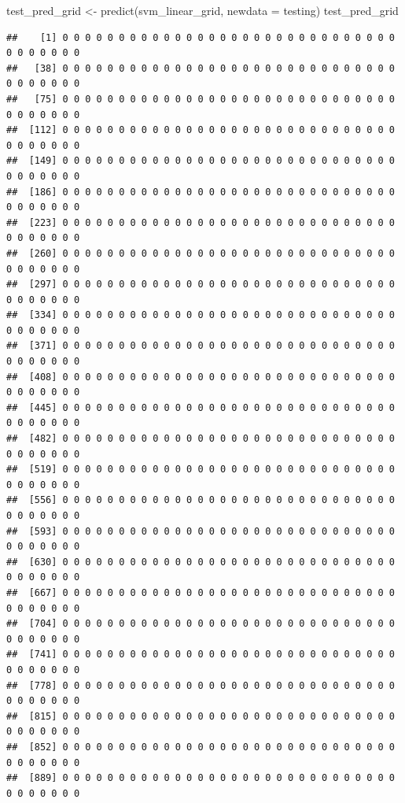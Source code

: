 \documentclass[
]{article}
\newenvironment{Shaded}{\begin{snugshade}}{\end{snugshade}}
\newcommand{\AttributeTok}[1]{\textcolor[rgb]{0.77,0.63,0.00}{#1}}
\newcommand{\FunctionTok}[1]{\textcolor[rgb]{0.00,0.00,0.00}{#1}}
\newcommand{\NormalTok}[1]{#1}
\newcommand{\OtherTok}[1]{\textcolor[rgb]{0.56,0.35,0.01}{#1}}
\renewcommand{\=}[1]{\stackrel{#1}{=}}
\theoremstyle{definition}
\theoremstyle{remark}
\begin{document}
\begin{Shaded}
\begin{Highlighting}[]
\NormalTok{test\_pred\_grid }\OtherTok{\textless{}{-}} \FunctionTok{predict}\NormalTok{(svm\_linear\_grid, }\AttributeTok{newdata =}\NormalTok{ testing)}
\NormalTok{test\_pred\_grid }
\end{Highlighting}
\end{Shaded}

\begin{verbatim}
##    [1] 0 0 0 0 0 0 0 0 0 0 0 0 0 0 0 0 0 0 0 0 0 0 0 0 0 0 0 0 0 0 0 0 0 0 0 0 0
##   [38] 0 0 0 0 0 0 0 0 0 0 0 0 0 0 0 0 0 0 0 0 0 0 0 0 0 0 0 0 0 0 0 0 0 0 0 0 0
##   [75] 0 0 0 0 0 0 0 0 0 0 0 0 0 0 0 0 0 0 0 0 0 0 0 0 0 0 0 0 0 0 0 0 0 0 0 0 0
##  [112] 0 0 0 0 0 0 0 0 0 0 0 0 0 0 0 0 0 0 0 0 0 0 0 0 0 0 0 0 0 0 0 0 0 0 0 0 0
##  [149] 0 0 0 0 0 0 0 0 0 0 0 0 0 0 0 0 0 0 0 0 0 0 0 0 0 0 0 0 0 0 0 0 0 0 0 0 0
##  [186] 0 0 0 0 0 0 0 0 0 0 0 0 0 0 0 0 0 0 0 0 0 0 0 0 0 0 0 0 0 0 0 0 0 0 0 0 0
##  [223] 0 0 0 0 0 0 0 0 0 0 0 0 0 0 0 0 0 0 0 0 0 0 0 0 0 0 0 0 0 0 0 0 0 0 0 0 0
##  [260] 0 0 0 0 0 0 0 0 0 0 0 0 0 0 0 0 0 0 0 0 0 0 0 0 0 0 0 0 0 0 0 0 0 0 0 0 0
##  [297] 0 0 0 0 0 0 0 0 0 0 0 0 0 0 0 0 0 0 0 0 0 0 0 0 0 0 0 0 0 0 0 0 0 0 0 0 0
##  [334] 0 0 0 0 0 0 0 0 0 0 0 0 0 0 0 0 0 0 0 0 0 0 0 0 0 0 0 0 0 0 0 0 0 0 0 0 0
##  [371] 0 0 0 0 0 0 0 0 0 0 0 0 0 0 0 0 0 0 0 0 0 0 0 0 0 0 0 0 0 0 0 0 0 0 0 0 0
##  [408] 0 0 0 0 0 0 0 0 0 0 0 0 0 0 0 0 0 0 0 0 0 0 0 0 0 0 0 0 0 0 0 0 0 0 0 0 0
##  [445] 0 0 0 0 0 0 0 0 0 0 0 0 0 0 0 0 0 0 0 0 0 0 0 0 0 0 0 0 0 0 0 0 0 0 0 0 0
##  [482] 0 0 0 0 0 0 0 0 0 0 0 0 0 0 0 0 0 0 0 0 0 0 0 0 0 0 0 0 0 0 0 0 0 0 0 0 0
##  [519] 0 0 0 0 0 0 0 0 0 0 0 0 0 0 0 0 0 0 0 0 0 0 0 0 0 0 0 0 0 0 0 0 0 0 0 0 0
##  [556] 0 0 0 0 0 0 0 0 0 0 0 0 0 0 0 0 0 0 0 0 0 0 0 0 0 0 0 0 0 0 0 0 0 0 0 0 0
##  [593] 0 0 0 0 0 0 0 0 0 0 0 0 0 0 0 0 0 0 0 0 0 0 0 0 0 0 0 0 0 0 0 0 0 0 0 0 0
##  [630] 0 0 0 0 0 0 0 0 0 0 0 0 0 0 0 0 0 0 0 0 0 0 0 0 0 0 0 0 0 0 0 0 0 0 0 0 0
##  [667] 0 0 0 0 0 0 0 0 0 0 0 0 0 0 0 0 0 0 0 0 0 0 0 0 0 0 0 0 0 0 0 0 0 0 0 0 0
##  [704] 0 0 0 0 0 0 0 0 0 0 0 0 0 0 0 0 0 0 0 0 0 0 0 0 0 0 0 0 0 0 0 0 0 0 0 0 0
##  [741] 0 0 0 0 0 0 0 0 0 0 0 0 0 0 0 0 0 0 0 0 0 0 0 0 0 0 0 0 0 0 0 0 0 0 0 0 0
##  [778] 0 0 0 0 0 0 0 0 0 0 0 0 0 0 0 0 0 0 0 0 0 0 0 0 0 0 0 0 0 0 0 0 0 0 0 0 0
##  [815] 0 0 0 0 0 0 0 0 0 0 0 0 0 0 0 0 0 0 0 0 0 0 0 0 0 0 0 0 0 0 0 0 0 0 0 0 0
##  [852] 0 0 0 0 0 0 0 0 0 0 0 0 0 0 0 0 0 0 0 0 0 0 0 0 0 0 0 0 0 0 0 0 0 0 0 0 0
##  [889] 0 0 0 0 0 0 0 0 0 0 0 0 0 0 0 0 0 0 0 0 0 0 0 0 0 0 0 0 0 0 0 0 0 0 0 0 0

\end{verbatim}
\end{document}

